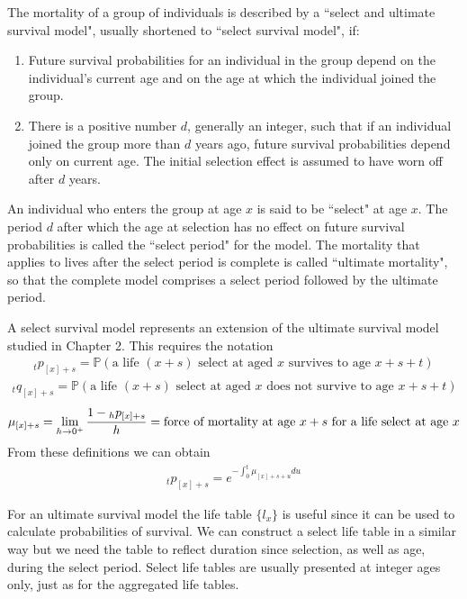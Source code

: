\documentclass[hidelinks, 12pt]{article}
\theoremstyle{mydefstyle}
\theoremstyle{mythmstyle}
\begin{document}
The mortality of a group of individuals is described by a ``select and ultimate survival model", usually shortened to ``select survival model", if:
\begin{enumerate}
\item Future survival probabilities for an individual in the group depend on the individual's current age and on the age at which the individual joined the group.
\item There is a positive number $d$, generally an integer, such that if an individual joined the group more than $d$ years ago, future survival probabilities depend only on current age. The initial selection effect is assumed to have worn off after $d$ years. 
\end{enumerate}
An individual who enters the group at age $x$ is said to be ``select" at age $x$. The period $d$ after which the age at selection has no effect on future survival probabilities is called the ``select period" for the model. The mortality that applies to lives after the select period is complete is called ``ultimate mortality", so that the complete model comprises a select period followed by the ultimate period. 

A select survival model represents an extension of the ultimate survival model studied in Chapter 2. This requires the notation
\begin{gather*}
_tp_{[x]+s} = \mathbb{P}(\mbox{a life $(x+s)$ select at aged $x$ survives to age $x+s+t$})
\end{gather*}
\begin{gather*}
_tq_{[x]+s} = \mathbb{P}(\mbox{a life $(x+s)$ select at aged $x$ does not survive to age $x+s+t$})
\end{gather*}
\begin{gather*}
\mu_{[x]+s} = \lim_{h\to0^+} \frac{1 - \hspace{0mm}_hp_{[x]+s}}{h} = \mbox{force of mortality at age $x+s$ for a life select at age $x$}
\end{gather*}
From these definitions we can obtain
\begin{gather*}
_tp_{[x]+s} = e^{-\int_0^t \mu_{[x]+s+u} du}
\end{gather*}

For an ultimate survival model the life table $\{l_x\}$ is useful since it can be used to calculate probabilities of survival. We can construct a select life table in a similar way but we need the table to reflect duration since selection, as well as age, during the select period. Select life tables are usually presented at integer ages only, just as for the aggregated life tables. 
\end{document}
